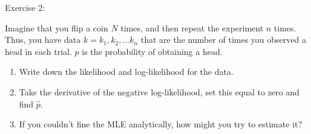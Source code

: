 \documentclass[12pt,xcolor=svgnames]{beamer}
\newcommand{\bl}{\color{blue}}
\newcommand{\nochap}{\vspace{0.5cm}}
\begin{document}
\begin{frame}
\nochap

{\bl Exercise 2:}\\

{\footnotesize
Imagine that you flip a coin $N$ times, and then repeat the experiment $n$ times. Thus, you have data $k=k_1, k_2, \dots k_n$ that are the number of times you observed a head in each trial. $p$ is the probability of obtaining a head. 
\begin{enumerate}
\item Write down the likelihood and log-likelihood for the data.
\item Take the derivative of the negative log-likelihood, set this equal to zero and find $\hat{p}$. 
\item If you couldn't fine the MLE analytically, how might you try to estimate it?
\end{enumerate}
}
\end{frame}
\end{document}
